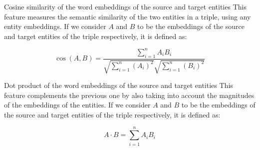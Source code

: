 



\scifeature
{Cosine similarity of the word embeddings of the source and target entities}
{This feature measures the semantic similarity of the two entities in a triple, using any entity embeddings. If we consider $A$ and $B$ to be the embeddings of the source and target entities of the triple respectively, it is defined as:}
        
\[
    \cos (A, B) = 
    \frac{ \sum_{i=1}^{n}{{A}_i{B}_i} }{ \sqrt{\sum_{i=1}^{n}{({A}_i)^2}} \sqrt{\sum_{i=1}^{n}{({B}_i)^2}} }
\]

\scifeature
{Dot product of the word embeddings of the source and target entities}
{This feature complements the previous one by also taking into account the magnitudes of the embeddings of the entities. If we consider $A$ and $B$ to be the embeddings of the source and target entities of the triple respectively, it is defined as:}

\[
    A \cdot B = \sum_{i=1}^{n}{A_i B_i}
\]

\newpage

